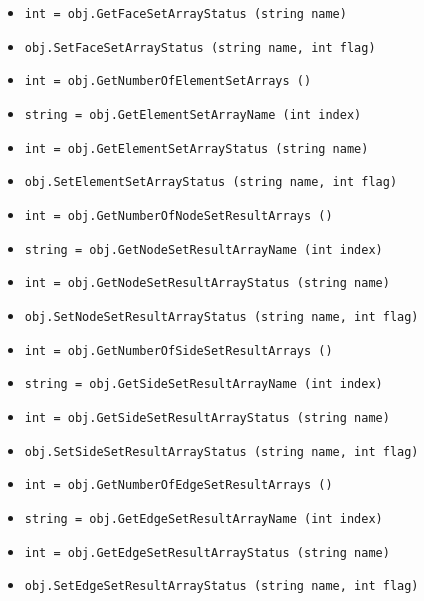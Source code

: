 \begin{itemize}
\item  \verb|int = obj.GetFaceSetArrayStatus (string name)|

\item  \verb|obj.SetFaceSetArrayStatus (string name, int flag)|

\item  \verb|int = obj.GetNumberOfElementSetArrays ()|

\item  \verb|string = obj.GetElementSetArrayName (int index)|

\item  \verb|int = obj.GetElementSetArrayStatus (string name)|

\item  \verb|obj.SetElementSetArrayStatus (string name, int flag)|

\item  \verb|int = obj.GetNumberOfNodeSetResultArrays ()|

\item  \verb|string = obj.GetNodeSetResultArrayName (int index)|

\item  \verb|int = obj.GetNodeSetResultArrayStatus (string name)|

\item  \verb|obj.SetNodeSetResultArrayStatus (string name, int flag)|

\item  \verb|int = obj.GetNumberOfSideSetResultArrays ()|

\item  \verb|string = obj.GetSideSetResultArrayName (int index)|

\item  \verb|int = obj.GetSideSetResultArrayStatus (string name)|

\item  \verb|obj.SetSideSetResultArrayStatus (string name, int flag)|

\item  \verb|int = obj.GetNumberOfEdgeSetResultArrays ()|

\item  \verb|string = obj.GetEdgeSetResultArrayName (int index)|

\item  \verb|int = obj.GetEdgeSetResultArrayStatus (string name)|

\item  \verb|obj.SetEdgeSetResultArrayStatus (string name, int flag)|


\end{itemize}
